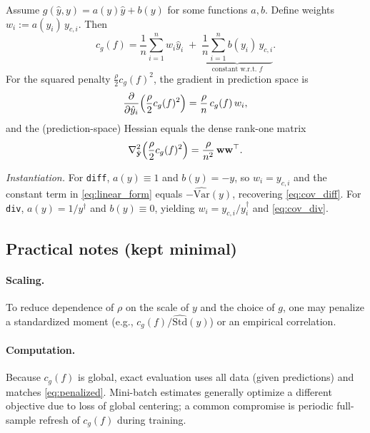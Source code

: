 \documentclass[11pt]{article}
\theoremstyle{plain}
\theoremstyle{definition}
\newcommand{\1}{\mathbf{1}}
\begin{document}
\begin{lemma}
\label{lem:rank_one}
Assume $g(\hat y,y)=a(y)\hat y+b(y)$ for some functions $a,b$. Define weights
$w_i:=a(y_i)\,y_{c,i}$. Then
\begin{equation}
\label{eq:linear_form}
c_g(f)=\frac{1}{n}\sum_{i=1}^n w_i \hat y_i \;+\; \underbrace{\frac{1}{n}\sum_{i=1}^n b(y_i)\,y_{c,i}}_{\text{constant w.r.t. }f}.
\end{equation}
For the squared penalty $\frac{\rho}{2}c_g(f)^2$, the gradient in prediction space is
\begin{equation}
\label{eq:grad_general}
\frac{\partial}{\partial \hat y_i}\Bigl(\frac{\rho}{2}c_g(f)^2\Bigr)
=\frac{\rho}{n}\,c_g(f)\,w_i,
\end{equation}
and the (prediction-space) Hessian equals the dense rank-one matrix
\begin{equation}
\label{eq:hess_general}
\nabla^2_{\hat{\mathbf y}}\Bigl(\frac{\rho}{2}c_g(f)^2\Bigr)=\frac{\rho}{n^2}\,\mathbf w\mathbf w^\top.
\end{equation}
\end{lemma}

\noindent
\emph{Instantiation.}
For \texttt{diff}, $a(y)\equiv 1$ and $b(y)=-y$, so $w_i=y_{c,i}$ and the constant term in
\eqref{eq:linear_form} equals $-\widehat{\mathrm{Var}}(y)$, recovering \eqref{eq:cov_diff}.
For \texttt{div}, $a(y)=1/y^\dagger$ and $b(y)\equiv 0$, yielding $w_i=y_{c,i}/y_i^\dagger$ and
\eqref{eq:cov_div}.

\subsection{Practical notes (kept minimal)}
\label{sec:practical_min}

\paragraph{Scaling.}
To reduce dependence of $\rho$ on the scale of $y$ and the choice of $g$, one may penalize a standardized
moment (e.g., $c_g(f)/\widehat{\mathrm{Std}}(y)$) or an empirical correlation.

\paragraph{Computation.}
Because $c_g(f)$ is global, exact evaluation uses all data (given predictions) and matches
\eqref{eq:penalized}. Mini-batch estimates generally optimize a different objective due to loss of
global centering; a common compromise is periodic full-sample refresh of $c_g(f)$ during training.
\end{document}
